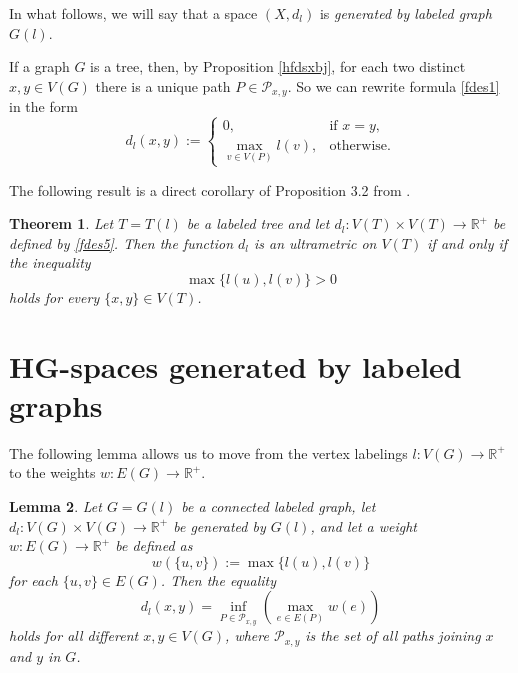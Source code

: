 \documentclass[pdflatex,sn-mathphys-num]{sn-jnl}%
\theoremstyle{thmstyleone}%
\newtheorem{Theorem}{Theorem}[section]
\newtheorem{Lemma}[Theorem]{Lemma}
\theoremstyle{thmstyletwo}%
\theoremstyle{thmstylethree}%
\theoremstyle{thmstyletwo}%
\theoremstyle{thmstylethree}%
\begin{document}
In what follows, we will say that a space $(X,d_l)$ is {\it generated by 
labeled graph} $G (l)$.



If a graph $G$ is a tree, then, by Proposition \ref{hfdsxbj}, for each two distinct $x,y \in V(G)$ there is a unique path $P\in \mathcal{P}_{x,y}$.
So we can rewrite formula \eqref{fdes1} in the form
\begin{equation}
    \label{fdes5}
d_l(x,y) := 
\begin{cases}
0, & \text{if } x = y, \\
\max\limits_{v \in V(P)} l(v), & \text{otherwise}.
\end{cases}
\end{equation}

The following result is a direct corollary of Proposition 3.2 from \cite{Dov2020TaAoG}.

\begin{Theorem}\label{t2t} Let $T = T(l)$ be a labeled tree and let $d_l \colon V(T)\times V(T) \to \mathbb R^+$ be defined by \eqref{fdes5}. Then the function $d_l$ is an ultrametric on $V(T)$ if and only if the inequality
\begin{equation*}
\max\{l(u), l(v)\} > 0
\end{equation*}
holds for every  $\{x,y\}\in V(T)$.
\end{Theorem}





\section{HG-spaces generated by labeled graphs}\label{sec3}



The following lemma allows us to move from the vertex labelings $l \colon V(G) \to \mathbb R^+$ to the weights $w \colon E(G) \to \mathbb R^+$.




\begin{Lemma}\label{fruj} 
Let $G = G(l)$ be a connected labeled graph,
let $d_l : V(G) \times V(G) \to \mathbb{R}^+$ be generated by $G(l)$, and
let a weight $w : E(G) \to \mathbb{R}^+$ be defined as
\begin{equation}
    \label{00*}
w(\{u,v\}) := \max\{l(u), l(v)\}
\end{equation}
for each $\{u,v\} \in E(G)$. Then the equality
\begin{equation}
    \label{zero}
d_l(x,y)
=
\inf_{P \in \mathcal{P}_{x,y}} \left( \max_{e \in E(P)} w(e) \right)
\end{equation}
holds for all different $x,y\in V(G)$, where $\mathcal{P}_{x,y}$ is the set of all paths joining $x$ and $y$ in $G$.
\end{Lemma}
\end{document}
